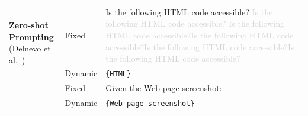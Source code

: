 \documentclass[sigconf, nonacm]{acmart}
\begin{document}
\begin{table}
{\begin{tabular}{p{2.5cm} p{1cm} p{13cm}}
\multirow{2}{*}{\parbox[t]{3.2cm}{\textbf{Zero-shot} \\ \textbf{Prompting} \\(Delnevo et al.~\cite{DBLP:conf/ccnc/DelnevoAM24})}} 
& Fixed & Is the following HTML code accessible? \textcolor{lightgray}{Is the following HTML code accessible?}
\textcolor{lightgray}{Is the following HTML code accessible?}\textcolor{lightgray}{Is the following HTML code accessible?}\textcolor{lightgray}{Is the following HTML code accessible?}\textcolor{lightgray}{Is the following HTML code accessible?}\\

& Dynamic & \texttt{\{HTML\}}  \\
\rowcolor{blue!10} &Fixed & Given the Web page screenshot: \\
\rowcolor{blue!10} &Dynamic & \texttt{\{Web page screenshot\}} \\
\bottomrule
\end{tabular}}
\end{table}


\clearpage
\end{document}

